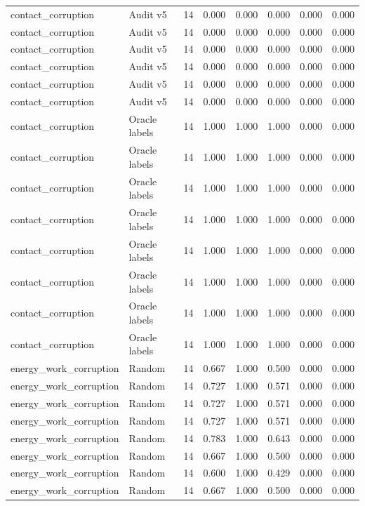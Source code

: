 {\begin{longtable}{llrrrrrr}
contact\_corruption & Audit v5 & 14 & 0.000 & 0.000 & 0.000 & 0.000 & 0.000 \\
contact\_corruption & Audit v5 & 14 & 0.000 & 0.000 & 0.000 & 0.000 & 0.000 \\
contact\_corruption & Audit v5 & 14 & 0.000 & 0.000 & 0.000 & 0.000 & 0.000 \\
contact\_corruption & Audit v5 & 14 & 0.000 & 0.000 & 0.000 & 0.000 & 0.000 \\
contact\_corruption & Audit v5 & 14 & 0.000 & 0.000 & 0.000 & 0.000 & 0.000 \\
contact\_corruption & Audit v5 & 14 & 0.000 & 0.000 & 0.000 & 0.000 & 0.000 \\
contact\_corruption & Oracle labels & 14 & 1.000 & 1.000 & 1.000 & 0.000 & 0.000 \\
contact\_corruption & Oracle labels & 14 & 1.000 & 1.000 & 1.000 & 0.000 & 0.000 \\
contact\_corruption & Oracle labels & 14 & 1.000 & 1.000 & 1.000 & 0.000 & 0.000 \\
contact\_corruption & Oracle labels & 14 & 1.000 & 1.000 & 1.000 & 0.000 & 0.000 \\
contact\_corruption & Oracle labels & 14 & 1.000 & 1.000 & 1.000 & 0.000 & 0.000 \\
contact\_corruption & Oracle labels & 14 & 1.000 & 1.000 & 1.000 & 0.000 & 0.000 \\
contact\_corruption & Oracle labels & 14 & 1.000 & 1.000 & 1.000 & 0.000 & 0.000 \\
contact\_corruption & Oracle labels & 14 & 1.000 & 1.000 & 1.000 & 0.000 & 0.000 \\
energy\_work\_corruption & Random & 14 & 0.667 & 1.000 & 0.500 & 0.000 & 0.000 \\
energy\_work\_corruption & Random & 14 & 0.727 & 1.000 & 0.571 & 0.000 & 0.000 \\
energy\_work\_corruption & Random & 14 & 0.727 & 1.000 & 0.571 & 0.000 & 0.000 \\
energy\_work\_corruption & Random & 14 & 0.727 & 1.000 & 0.571 & 0.000 & 0.000 \\
energy\_work\_corruption & Random & 14 & 0.783 & 1.000 & 0.643 & 0.000 & 0.000 \\
energy\_work\_corruption & Random & 14 & 0.667 & 1.000 & 0.500 & 0.000 & 0.000 \\
energy\_work\_corruption & Random & 14 & 0.600 & 1.000 & 0.429 & 0.000 & 0.000 \\
energy\_work\_corruption & Random & 14 & 0.667 & 1.000 & 0.500 & 0.000 & 0.000 \\

\end{longtable}}
